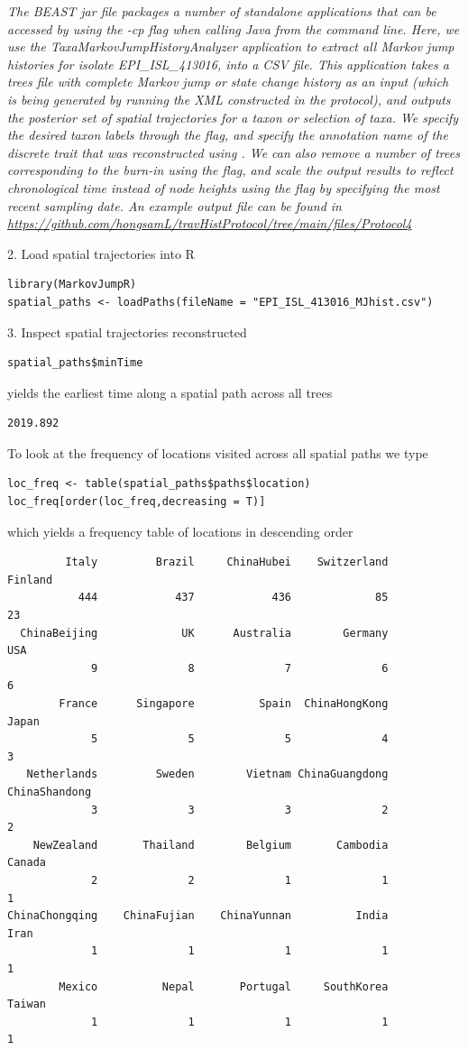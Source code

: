 \documentclass{article}
\newcommand{\ann}[1]{
\begin{adjustwidth}{0.5cm}{}
\it{#1}\\
\end{adjustwidth}}
\newcommand{\code}[1]{
{\upshape\ttfamily{#1}}}
\begin{document}
\ann{The BEAST jar file packages a number of standalone applications that can be accessed by using the -cp flag when calling Java from the command line.
Here, we use the TaxaMarkovJumpHistoryAnalyzer application to extract all Markov jump histories for isolate EPI\_ISL\_413016, into a CSV file.
This application takes a trees file with complete Markov jump or state change history as an input (which is being generated by running the XML constructed in the protocol), and outputs the posterior set of spatial trajectories for a taxon or selection of taxa.
We specify the desired taxon labels through the\code{-taxaToProcess} flag, and specify the annotation name of the discrete trait that was reconstructed using \code{-stateAnnotation}.
We can also remove a number of trees corresponding to the burn-in using the \code{-burnin} flag, and scale the output results to reflect chronological time instead of node heights using the \code{-msrd} flag by specifying the most recent sampling date.
An example output file can be found in {\upshape\url{https://github.com/hongsamL/travHistProtocol/tree/main/files/Protocol4}}}

2. Load spatial trajectories into R
\begin{verbatim}
library(MarkovJumpR)
spatial_paths <- loadPaths(fileName = "EPI_ISL_413016_MJhist.csv")
\end{verbatim}

3. Inspect spatial trajectories reconstructed
\begin{verbatim}
spatial_paths$minTime
\end{verbatim}
yields the earliest time along a spatial path across all trees
\begin{verbatim}
2019.892
\end{verbatim}


To look at the frequency of locations visited across all spatial paths we type
\begin{verbatim}
loc_freq <- table(spatial_paths$paths$location)
loc_freq[order(loc_freq,decreasing = T)]
\end{verbatim}
which yields a frequency table of locations in descending order
\begin{verbatim}
         Italy         Brazil     ChinaHubei    Switzerland        Finland
           444            437            436             85             23
  ChinaBeijing             UK      Australia        Germany            USA
             9              8              7              6              6
        France      Singapore          Spain  ChinaHongKong          Japan
             5              5              5              4              3
   Netherlands         Sweden        Vietnam ChinaGuangdong  ChinaShandong
             3              3              3              2              2
    NewZealand       Thailand        Belgium       Cambodia         Canada
             2              2              1              1              1
ChinaChongqing    ChinaFujian    ChinaYunnan          India           Iran
             1              1              1              1              1
        Mexico          Nepal       Portugal     SouthKorea         Taiwan
             1              1              1              1              1
\end{verbatim}
\end{document}
